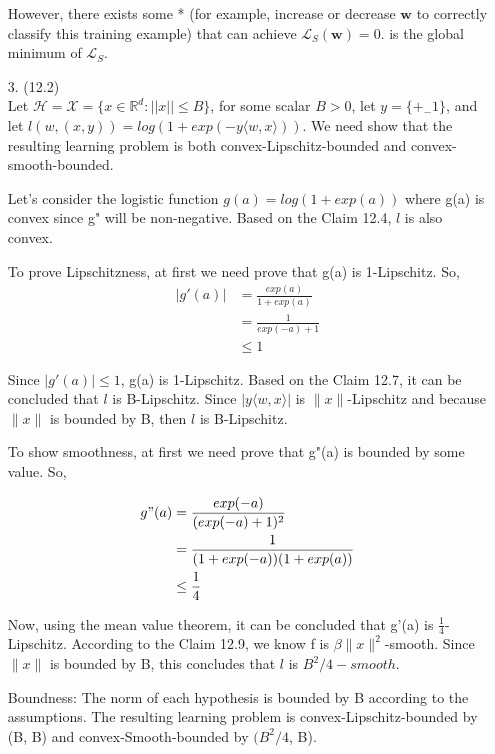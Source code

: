 \documentclass[12pt,letterpaper]{article}
\begin{document}
\begin{enumerate}
However, there exists some * (for example, increase or decrease $\mathbf{w}$ to correctly classify this training example) that can achieve $\mathcal{L}_S(\mathbf{w}) = 0$.  is the global minimum of $\mathcal{L}_S$.

\vspace{8pt}

\item[3.] (12.2) \\
Let $\mathcal{H} = \mathcal{X} = \{x \in \mathbb{R}^d : ||x|| \leq B\}$, for some scalar $B>0$, let $y=\{+_-1\}$, and let $l(w,(x,y))=log(1 + exp(-y \langle w, x \rangle ))$. We need show that the resulting learning problem is both convex-Lipschitz-bounded and convex-smooth-bounded.

Let's consider the logistic function $g(a) = log(1+exp(a))$ where g(a) is convex since g" will be non-negative. Based on the Claim 12.4, $l$ is also convex. 

To  prove  Lipschitzness,  at first  we need prove  that g(a) is  1-Lipschitz. So,
\begin{align*}
    |g'(a)| &= \frac{exp(a)}{1+exp(a)}\\
    &= \frac{1}{exp(-a)+1} \\
    &\leq 1
\end{align*}

Since $|g'(a)| \leq 1$, g(a) is 1-Lipschitz. Based on the Claim 12.7, it can be concluded that $l$ is B-Lipschitz. Since $|y\langle w,x\rangle|$ is $\|x\|$-Lipschitz and because $\|x\|$ is bounded by B, then $l$ is B-Lipschitz.

To show smoothness, at first we need prove that g"(a) is bounded by some value. So,

\begin{align*}
g"(a) &= \frac{exp(-a)}{(exp(-a)+1)^2} \\
&= \frac{1}{(1+exp(-a))(1+exp(a))}\\
&\leq \frac{1}{4}
\end{align*}

Now, using the mean value theorem, it can be concluded that g'(a) is $\frac{1}{4}$-Lipschitz. According to the Claim 12.9, we know f is $\beta\|x\|^2$-smooth. Since $\|x\|$ is bounded by B, this concludes that $l$ is $B^2/4-smooth$.

Boundness: The  norm  of  each  hypothesis  is bounded  by B according to the assumptions. The resulting learning problem is convex-Lipschitz-bounded by (B, B) and convex-Smooth-bounded by $(B^2/4$, B).



\end{enumerate}
\end{document}
